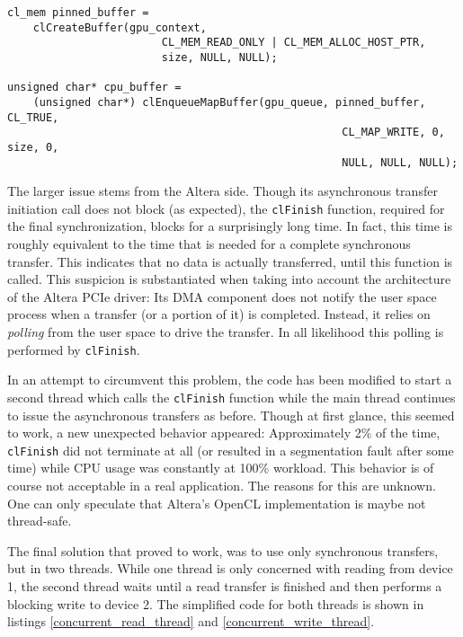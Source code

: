 \begin{lstlisting}[label=pinned_opencl,morekeywords={}, caption= Creation of a pinned CPU buffer in OpenCL]
cl_mem pinned_buffer =
    clCreateBuffer(gpu_context, 
                        CL_MEM_READ_ONLY | CL_MEM_ALLOC_HOST_PTR, 
                        size, NULL, NULL);

unsigned char* cpu_buffer = 
    (unsigned char*) clEnqueueMapBuffer(gpu_queue, pinned_buffer, CL_TRUE, 
                                                    CL_MAP_WRITE, 0, size, 0,
                                                    NULL, NULL, NULL); 
\end{lstlisting}


The larger issue stems from the Altera side.
Though its asynchronous transfer initiation call does not block (as expected), the \texttt{clFinish} function, required for the final synchronization, blocks for a surprisingly long time.
In fact, this time is roughly equivalent to the time that is needed for a complete synchronous transfer.
This indicates that no data is actually transferred, until this function is called.
This suspicion is substantiated when taking into account the architecture of the Altera PCIe driver:
Its DMA component does not notify the user space process when a transfer (or a portion of it) is completed.
Instead, it relies on \emph{polling} from the user space to drive the transfer.
In all likelihood this polling is performed by \texttt{clFinish}.

In an attempt to circumvent this problem, the code has been modified to start a second thread which calls the \texttt{clFinish} function while the main thread continues to issue the asynchronous transfers as before.
Though at first glance, this seemed to work, a new unexpected behavior appeared:
Approximately 2\% of the time, \texttt{clFinish} did not terminate at all (or resulted in a segmentation fault after some time) while CPU usage was constantly at 100\% workload.
This behavior is of course not acceptable in a real application.
The reasons for this are unknown.
One can only speculate that Altera's OpenCL implementation is maybe not thread-safe.

The final solution that proved to work, was to use only synchronous transfers, but in two threads.
While one thread is only concerned with reading from device 1, the second thread waits until a read transfer is finished and then performs a blocking write to device 2.
The simplified code for both threads is shown in listings \ref{concurrent_read_thread} and \ref{concurrent_write_thread}.

